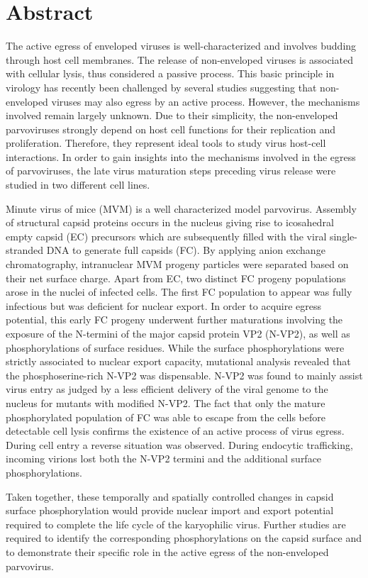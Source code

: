 

\chapter*{Abstract}

\label{Abstract} %


The active egress of enveloped viruses is well-characterized and involves budding through host cell membranes. The release of non-enveloped viruses is associated with cellular lysis, thus considered a passive process. This basic principle in virology has recently been challenged by several studies suggesting that non-enveloped viruses may also egress by an active process. However, the mechanisms involved remain largely unknown. Due to their simplicity, the non-enveloped parvoviruses strongly depend on host cell functions for their replication and proliferation. Therefore, they represent ideal tools to study virus host-cell interactions. In order to gain insights into the mechanisms involved in the egress of parvoviruses, the late virus maturation steps preceding virus release were studied in two different cell lines. 
	
\par
\medskip
Minute virus of mice (MVM) is a well characterized model parvovirus. Assembly of structural capsid proteins occurs in the nucleus giving rise to icosahedral empty capsid (EC) precursors which are subsequently filled with the viral single-stranded DNA to generate full capsids (FC). By applying anion exchange chromatography, intranuclear MVM progeny particles were separated based on their net surface charge. Apart from EC, two distinct FC progeny populations arose in the nuclei of infected cells. The first FC population to appear was fully infectious but was deficient for nuclear export. In order to acquire egress potential, this early FC progeny underwent further maturations involving the exposure of the N-termini of the major capsid protein VP2 (N-VP2), as well as phosphorylations of surface residues. While the surface phosphorylations were strictly associated to nuclear export capacity, mutational analysis revealed that the phosphoserine-rich N-VP2 was dispensable. N-VP2 was found to mainly assist virus entry as judged by a less efficient delivery of the viral genome to the nucleus for mutants with modified N-VP2. The fact that only the mature phosphorylated population of FC was able to escape from the cells before detectable cell lysis confirms the existence of an active process of virus egress. During cell entry a reverse situation was observed. During endocytic trafficking, incoming virions lost both the N-VP2 termini and the additional surface phosphorylations. 
	
\par
\medskip
Taken together, these temporally and spatially controlled changes in capsid surface phosphorylation would provide nuclear import and export potential required to complete the life cycle of the karyophilic virus. Further studies are required to identify the corresponding phosphorylations on the capsid surface and to demonstrate their specific role in the active egress of the non-enveloped parvovirus. 